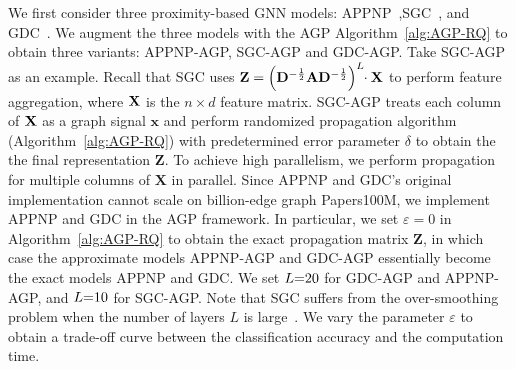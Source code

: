 We first consider three proximity-based GNN models: APPNP~\cite{Klicpera2018APPNP},SGC~\cite{wu2019SGC}, and GDC~\cite{klicpera2019GDC}. We augment the three models with the AGP Algorithm~\ref{alg:AGP-RQ} to obtain three variants: APPNP-AGP, SGC-AGP and GDC-AGP. Take SGC-AGP as an example. Recall that SGC uses $\mathbf{Z}=\left(\mathbf{D}^{-\frac{1}{2}} \mathbf{A}\mathbf{D}^{-\frac{1}{2}} \right)^L \hspace{-1mm}\cdot \mathbf{X}$ to perform feature aggregation, where $\mathbf{X}$ is the $n\times d$ feature matrix. SGC-AGP treats each column of $\mathbf{X}$ as a graph signal $\bm{x}$ and perform randomized propagation algorithm (Algorithm~\ref{alg:AGP-RQ}) with predetermined error parameter $\delta$ to obtain the the final representation $\mathbf{Z}$. To achieve high parallelism, we perform propagation for multiple columns of $\mathbf{X}$ in parallel. Since APPNP and GDC's original implementation cannot scale on billion-edge graph Papers100M, we implement APPNP and GDC in the AGP framework. In particular, we set $\varepsilon = 0$ in Algorithm~\ref{alg:AGP-RQ} to obtain the exact propagation matrix $\mathbf{Z}$, in which case the approximate models APPNP-AGP and GDC-AGP essentially become the exact models APPNP and GDC. We set $L\hspace{-1mm}=\hspace{-1mm}20$ for GDC-AGP and APPNP-AGP, and $L\hspace{-1mm}=\hspace{-1mm}10$ for SGC-AGP. Note that SGC suffers from the over-smoothing problem when the number of layers $L$ is large~\cite{wu2019SGC}. We vary the parameter $\varepsilon$ to obtain a trade-off curve between the classification accuracy and the computation time. 

